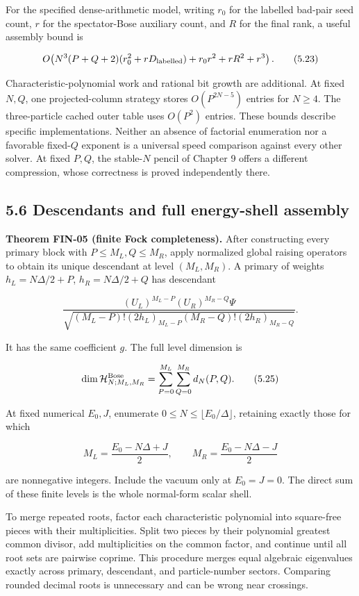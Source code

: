 For the specified dense-arithmetic model, writing \(r_0\) for the labelled bad-pair seed count, \(r\) for the spectator-Bose auxiliary count, and \(R\) for the final rank, a useful assembly bound is

\[
O\!\left(N^3(P+Q+2)(r_0^2+rD_{\rm labelled})
+r_0r^2+rR^2+r^3\right).
\tag{5.23}
\]

Characteristic-polynomial work and rational bit growth are additional. At fixed \(N,Q\), one projected-column strategy stores \(O(P^{2N-5})\) entries for \(N\ge4\). The three-particle cached outer table uses \(O(P^2)\) entries. These bounds describe specific implementations. Neither an absence of factorial enumeration nor a favorable fixed-\(Q\) exponent is a universal speed comparison against every other solver. At fixed \(P,Q\), the stable-\(N\) pencil of Chapter 9 offers a different compression, whose correctness is proved independently there.

\hypertarget{descendants-and-full-energy-shell-assembly}{%
\subsection{5.6 Descendants and full energy-shell assembly}\label{descendants-and-full-energy-shell-assembly}}

\textbf{Theorem FIN-05 (finite Fock completeness).} After constructing every primary block with \(P\le M_L,Q\le M_R\), apply normalized global raising operators to obtain its unique descendant at level \((M_L,M_R)\). A primary of weights \(h_L=N\Delta/2+P\), \(h_R=N\Delta/2+Q\) has descendant

\[
\frac{(U_L)^{M_L-P}(U_R)^{M_R-Q}\Psi}
{\sqrt{(M_L-P)!(2h_L)_{M_L-P}(M_R-Q)!(2h_R)_{M_R-Q}}}.
\tag{5.24}
\]

It has the same coefficient \(g\). The full level dimension is

\[
\dim\mathcal H^{\rm Bose}_{N;M_L,M_R}
=\sum_{P=0}^{M_L}\sum_{Q=0}^{M_R}d_N(P,Q).
\tag{5.25}
\]

At fixed numerical \(E_0,J\), enumerate \(0\le N\le\lfloor E_0/\Delta\rfloor\), retaining exactly those for which

\[
M_L=\frac{E_0-N\Delta+J}{2},\qquad
M_R=\frac{E_0-N\Delta-J}{2}
\tag{5.26}
\]

are nonnegative integers. Include the vacuum only at \(E_0=J=0\). The direct sum of these finite levels is the whole normal-form scalar shell.

To merge repeated roots, factor each characteristic polynomial into square-free pieces with their multiplicities. Split two pieces by their polynomial greatest common divisor, add multiplicities on the common factor, and continue until all root sets are pairwise coprime. This procedure merges equal algebraic eigenvalues exactly across primary, descendant, and particle-number sectors. Comparing rounded decimal roots is unnecessary and can be wrong near crossings.

